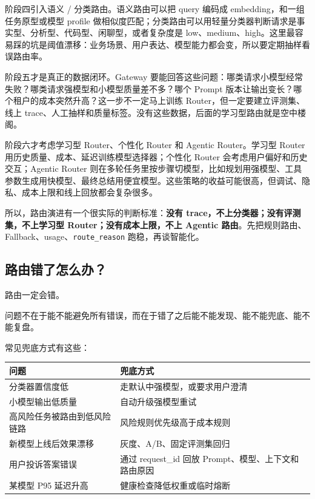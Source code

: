 \documentclass[10pt,a4paper]{ctexart}
\begin{document}
阶段四引入语义 / 分类路由。语义路由可以把 query 编码成 embedding，和一组任务原型或模型 profile 做相似度匹配；分类路由可以用轻量分类器判断请求是事实型、分析型、代码型、闲聊型，或者复杂度是 low、medium、high。这里最容易踩的坑是阈值漂移：业务场景、用户表达、模型能力都会变，所以要定期抽样看误路由率。



阶段五才是真正的数据闭环。Gateway 要能回答这些问题：哪类请求小模型经常失败？哪类请求强模型和小模型质量差不多？哪个 Prompt 版本让输出变长？哪个租户的成本突然升高？这一步不一定马上训练 Router，但一定要建立评测集、线上 trace、人工抽样和质量标签。没有这些数据，后面的学习型路由就是空中楼阁。



阶段六才考虑学习型 Router、个性化 Router 和 Agentic Router。学习型 Router 用历史质量、成本、延迟训练模型选择器；个性化 Router 会考虑用户偏好和历史交互；Agentic Router 则在多轮任务里按步骤切模型，比如规划用强模型、工具参数生成用快模型、最终总结用便宜模型。这些策略的收益可能很高，但调试、隐私、成本上限和线上回放都会复杂很多。



所以，路由演进有一个很实际的判断标准：\textbf{没有 trace，不上分类器；没有评测集，不上学习型 Router；没有成本上限，不上 Agentic 路由}。先把规则路由、Fallback、usage、\texttt{route\_reason} 跑稳，再谈智能化。



\subsection{路由错了怎么办？}


路由一定会错。



问题不在于能不能避免所有错误，而在于错了之后能不能发现、能不能兜底、能不能复盘。



常见兜底方式有这些：


{\footnotesize
\begin{tabularx}{\textwidth}{|X|X|}
\hline
\textbf{问题} & \textbf{兜底方式} \\
\hline
分类器置信度低 & 走默认中强模型，或要求用户澄清 \\
\hline
小模型输出低质量 & 自动升级强模型重试 \\
\hline
高风险任务被路由到低风险链路 & 风险规则优先级高于成本规则 \\
\hline
新模型上线后效果漂移 & 灰度、A/B、固定评测集回归 \\
\hline
用户投诉答案错误 & 通过 request\_id 回放 Prompt、模型、上下文和路由原因 \\
\hline
某模型 P95 延迟升高 & 健康检查降低权重或临时熔断 \\
\hline
\end{tabularx}
}
\end{document}
